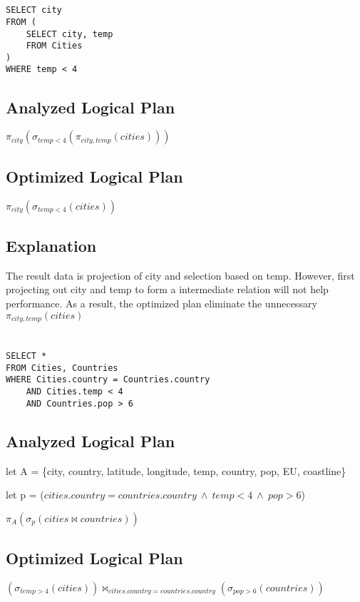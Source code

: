 \documentclass[12pt]{article}
\begin{document}
\section{}
\begin{verbatim}
SELECT city
FROM (
    SELECT city, temp
    FROM Cities
)
WHERE temp < 4
\end{verbatim}

\subsection*{Analyzed Logical Plan}
$\pi_{city}(\sigma_{temp < 4}(\pi_{city, temp}(cities)))$

\subsection*{Optimized Logical Plan}
$\pi_{city}(\sigma_{temp < 4}(cities))$

\subsection*{Explanation}
The result data is projection of city and selection based on temp. However, first projecting out city and temp to form a intermediate relation will not help performance. As a result, the optimized plan eliminate the unnecessary $\pi_{city, temp}(cities)$

\newpage

\section{}
\begin{verbatim}
SELECT *
FROM Cities, Countries
WHERE Cities.country = Countries.country
    AND Cities.temp < 4
    AND Countries.pop > 6
\end{verbatim}

\subsection*{Analyzed Logical Plan}
let A = \{city, country, latitude, longitude, temp, country, pop, EU, coastline\}

let p = ($cities.country = countries.country \: \land  \: temp < 4 \: \land \: pop > 6$)

$\pi_{A}(\sigma_{p}(cities \bowtie countries))$

\subsection*{Optimized Logical Plan}
$(\sigma_{temp > 4}(cities)) \bowtie_{cities.country = countries.country} (\sigma_{pop > 6}(countries))$
\end{document}
